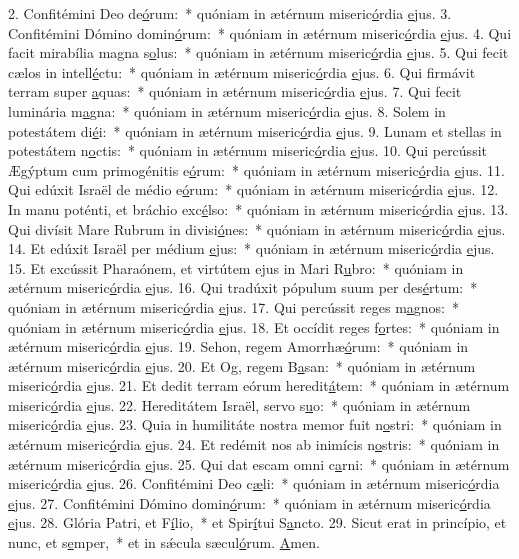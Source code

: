 2. Confitémini Deo de\uline{ó}rum:~* quóniam in ætérnum miseric\uline{ó}rdia \uline{e}jus.
3. Confitémini Dómino domin\uline{ó}rum:~* quóniam in ætérnum miseric\uline{ó}rdia \uline{e}jus.
4. Qui facit mirabília magna s\uline{o}lus:~* quóniam in ætérnum miseric\uline{ó}rdia \uline{e}jus.
5. Qui fecit cælos in intell\uline{é}ctu:~* quóniam in ætérnum miseric\uline{ó}rdia \uline{e}jus.
6. Qui firmávit terram super \uline{a}quas:~* quóniam in ætérnum miseric\uline{ó}rdia \uline{e}jus.
7. Qui fecit luminária m\uline{a}gna:~* quóniam in ætérnum miseric\uline{ó}rdia \uline{e}jus.
8. Solem in potestátem di\uline{é}i:~* quóniam in ætérnum miseric\uline{ó}rdia \uline{e}jus.
9. Lunam et stellas in potestátem n\uline{o}ctis:~* quóniam in ætérnum miseric\uline{ó}rdia \uline{e}jus.
10. Qui percússit Ægýptum cum primogénitis e\uline{ó}rum:~* quóniam in ætérnum miseric\uline{ó}rdia \uline{e}jus.
11. Qui edúxit Israël de médio e\uline{ó}rum:~* quóniam in ætérnum miseric\uline{ó}rdia \uline{e}jus.
12. In manu poténti, et bráchio exc\uline{é}lso:~* quóniam in ætérnum miseric\uline{ó}rdia \uline{e}jus.
13. Qui divísit Mare Rubrum in divisi\uline{ó}nes:~* quóniam in ætérnum miseric\uline{ó}rdia \uline{e}jus.
14. Et edúxit Israël per médium \uline{e}jus:~* quóniam in ætérnum miseric\uline{ó}rdia \uline{e}jus.
15. Et excússit Pharaónem, et virtútem ejus in Mari R\uline{u}bro:~* quóniam in ætérnum miseric\uline{ó}rdia \uline{e}jus.
16. Qui tradúxit pópulum suum per des\uline{é}rtum:~* quóniam in ætérnum miseric\uline{ó}rdia \uline{e}jus.
17. Qui percússit reges m\uline{a}gnos:~* quóniam in ætérnum miseric\uline{ó}rdia \uline{e}jus.
18. Et occídit reges f\uline{o}rtes:~* quóniam in ætérnum miseric\uline{ó}rdia \uline{e}jus.
19. Sehon, regem Amorrhæ\uline{ó}rum:~* quóniam in ætérnum miseric\uline{ó}rdia \uline{e}jus.
20. Et Og, regem B\uline{a}san:~* quóniam in ætérnum miseric\uline{ó}rdia \uline{e}jus.
21. Et dedit terram eórum heredit\uline{á}tem:~* quóniam in ætérnum miseric\uline{ó}rdia \uline{e}jus.
22. Hereditátem Israël, servo s\uline{u}o:~* quóniam in ætérnum miseric\uline{ó}rdia \uline{e}jus.
23. Quia in humilitáte nostra memor fuit n\uline{o}stri:~* quóniam in ætérnum miseric\uline{ó}rdia \uline{e}jus.
24. Et redémit nos ab inimícis n\uline{o}stris:~* quóniam in ætérnum miseric\uline{ó}rdia \uline{e}jus.
25. Qui dat escam omni c\uline{a}rni:~* quóniam in ætérnum miseric\uline{ó}rdia \uline{e}jus.
26. Confitémini Deo c\uline{æ}li:~* quóniam in ætérnum miseric\uline{ó}rdia \uline{e}jus.
27. Confitémini Dómino domin\uline{ó}rum:~* quóniam in ætérnum miseric\uline{ó}rdia \uline{e}jus.
28. Glória Patri, et F\uline{í}lio,~* et Spir\uline{í}tui S\uline{a}ncto.
29. Sicut erat in princípio, et nunc, et s\uline{e}mper,~* et in sǽcula sæcul\uline{ó}rum. \uline{A}men.
